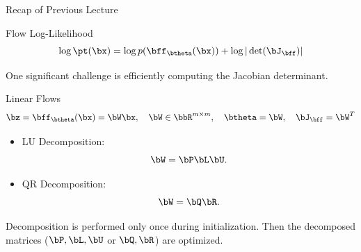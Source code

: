 \documentclass{beamer}
\begin{document}
\begin{frame}{Recap of Previous Lecture}
	\vspace{-0.5cm}
	\begin{block}{Flow Log-Likelihood}
		\vspace{-0.3cm}
		\[
			\log \pt(\bx) = \log p(\bff_{\btheta}(\bx)) + \log |\det (\bJ_\bff)|
		\]
		\vspace{-0.5cm}
	\end{block}
	One significant challenge is efficiently computing the Jacobian determinant.
	\begin{block}{Linear Flows}	
		\vspace{-0.2cm}
		\[
			\bz = \bff_{\btheta}(\bx) = \bW \bx, \quad \bW \in \bbR^{m \times m}, \quad \btheta = \bW, \quad \bJ_\bff = \bW^T
		\]
	\end{block}
	\vspace{-0.3cm}
	\begin{itemize}
		\item LU Decomposition:
		\[
			\bW = \bP \bL \bU.
		\]
		\item QR Decomposition:
		\[
			\bW = \bQ \bR.
		\]
	\end{itemize}
	Decomposition is performed only once during initialization. Then the decomposed matrices ($\bP, \bL, \bU$ or $\bQ, \bR$) are optimized.
\end{frame}
\end{document}
